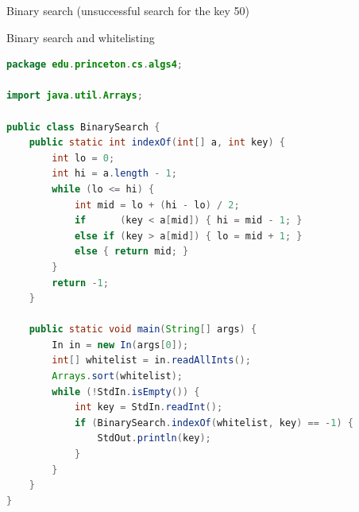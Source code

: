 \documentclass[8pt,a4paper,compress]{beamer}
\begin{document}
\begin{frame}[fragile]
\pause

Binary search (unsuccessful search for the key 50)
\begin{center}
\end{center}
\end{frame}

\begin{frame}[fragile]
\pause

Binary search and whitelisting

\begin{lstlisting}[language=Java]
package edu.princeton.cs.algs4;

import java.util.Arrays;

public class BinarySearch {
    public static int indexOf(int[] a, int key) {
        int lo = 0;
        int hi = a.length - 1;
        while (lo <= hi) {
            int mid = lo + (hi - lo) / 2;
            if      (key < a[mid]) { hi = mid - 1; }
            else if (key > a[mid]) { lo = mid + 1; }
            else { return mid; }
        }
        return -1;
    }

    public static void main(String[] args) {
        In in = new In(args[0]);
        int[] whitelist = in.readAllInts();
        Arrays.sort(whitelist);
        while (!StdIn.isEmpty()) {
            int key = StdIn.readInt();
            if (BinarySearch.indexOf(whitelist, key) == -1) {
                StdOut.println(key);
            }
        }
    }
}
\end{lstlisting}
\end{frame}
\end{document}

